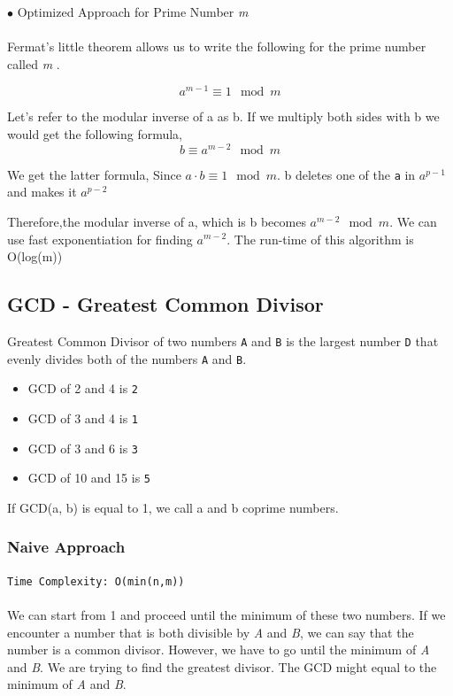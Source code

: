 \documentclass[12pt]{article}
\begin{document}
$\bullet$ Optimized Approach for Prime Number \textit{m} \\\\
Fermat's little theorem allows us to write the following for the prime number called \textit{m} \cite{fermant}.

\[ a^{m-1} \equiv 1 \mod{m} \]

Let's refer to the modular inverse of a as b. If we multiply both sides with b we would get the following formula,
\[b \equiv a^{m-2} \mod{m} \]

We get the latter formula, Since $ a \cdot b \equiv 1 \mod{m} $. b deletes one of the \texttt{a} in \texttt{$a^{p-1}$} and makes it \texttt{$a^{p-2}$}

Therefore,the modular inverse of a, which is b becomes  $a^{m-2} \mod{m}$. We can use fast exponentiation for finding $a^{m-2}$. The run-time of this algorithm is O(log(m))


\clearpage

\subsection{GCD - Greatest Common Divisor}
Greatest Common Divisor of two numbers \texttt{A} and \texttt{B} is the largest number \texttt{D} that evenly divides both of the numbers \texttt{A} and \texttt{B}. 
\begin{itemize}
  \item GCD of 2 and 4 is \texttt{2} 
  \item GCD of 3 and 4 is \texttt{1} 
  \item GCD of 3 and 6 is \texttt{3} 
  \item GCD of 10 and 15 is \texttt{5} 
\end{itemize}

If GCD(a, b) is equal to 1, we call a and b coprime numbers. 

\subsubsection{ Naive Approach }
\texttt{Time Complexity:  O(min(n,m)) } \\ \\
We can start from 1 and proceed until the minimum of these two numbers. If we encounter a number that is both divisible by \textit{A} and \textit{B}, we can say that the number is a common divisor. However, we have to go until the minimum of \textit{A} and \textit{B}. We are trying to find the greatest divisor. The GCD might equal to the minimum of \textit{A} and \textit{B}.
\end{document}

